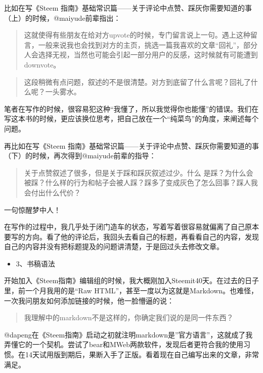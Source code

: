 \documentclass[]{ctexbook}
\providecommand{\tightlist}{%
  \setlength{\itemsep}{0pt}\setlength{\parskip}{0pt}}
\begin{document}
比如在写《Steem 指南》基础常识篇------关于评论中点赞、踩灰你需要知道的事（上）的时候，@maiyude前辈指出：

\begin{quote}
这就使得有些朋友在给对方upvote的时候，专门留言说上一句。遇上这种留言，一般来说我也会找到对方的主页，挑选一篇我喜欢的文章``回礼''，部分人会选择无视，当然也可能会引起一部分用户的反感，这时候就有可能遭到downvote。
\end{quote}

\begin{quote}
这段稍微有点问题，叙述的不是很清楚。对方到底留了什么言呢？回礼了什么呢？一头雾水。
\end{quote}

笔者在写作的时候，很容易犯这种``我懂了，所以我觉得你也能懂''的错误。我们在写这本书的时候，更应该换位思考，把自己放在一个``纯菜鸟''的角度，来阐述每个问题。

再比如在写《Steem 指南》基础常识篇------关于评论中点赞、踩灰你需要知道的事（下）的时候，再次得到@maiyude前辈的指导：

\begin{quote}
关于点赞叙述了很多，但是关于踩和踩灰叙述过少。什么 是踩？为什么会被踩？什么样的行为和帖子会被人踩？踩多了变成灰色了怎么回事？踩人我会付出什么代价？
\end{quote}

一句惊醒梦中人！

在写作的过程中，我几乎处于闭门造车的状态，写着写着很容易就偏离了自己原本要写的方向。看了他的评论后，我回头去看自己的标题，再看看自己的内容，发现自己的内容并没有把标题提及的问题讲清楚，于是回过头去修改文章。

\begin{itemize}
\tightlist
\item
  3、书稿语法
\end{itemize}

开始加入《Steem指南》编辑组的时候，我大概刚加入Steemit40天。在过去的日子里，前一个月我用的是``Raw HTML''，甚至一度以为这就是Markdown。也难怪，一次我问朋友如何添加链接的时候，他一脸懵逼的说：

\begin{quote}
我理解中的markdown不是这样的，你确定我们说的是同一件东西？
\end{quote}

@dapeng在《Steem指南》启动之初就注明markdown是''官方语言''，这就成了我弄懂它的一个契机。尝试了bear和MWeb两款软件，发现后者更符合我的使用习惯。在14天试用版到期后，果断入手了正版。看着现在自己编写出来的文章，非常满足。
\end{document}
